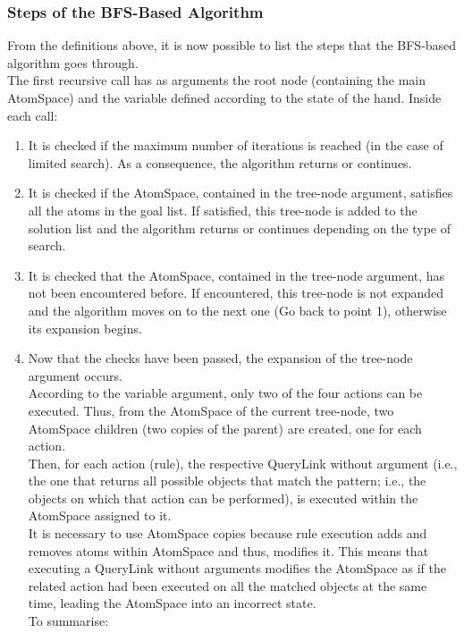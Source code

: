 \subsubsection{Steps of the BFS-Based Algorithm}\label{sec:step_search}

From the definitions above, it is now possible to list the steps that the BFS-based algorithm goes through. \\
The first recursive call has as arguments the root node (containing the main AtomSpace) and the variable defined according to the state of the hand.
Inside each call:

\begin{enumerate}
	\item It is checked if the maximum number of iterations is reached (in the case of limited search). As a consequence, the algorithm returns or continues.
	
	\item It is checked if the AtomSpace, contained in the tree-node argument, satisfies all the atoms in the goal list. If satisfied, this tree-node is added to the solution list and the algorithm returns or continues depending on the type of search.
	
	\item It is checked that the AtomSpace, contained in the tree-node argument, has not been encountered before. If encountered, this tree-node is not expanded and the algorithm moves on to the next one (Go back to point 1), otherwise its expansion begins.
	
	\item Now that the checks have been passed, the expansion of the tree-node argument occurs. \\
According to the variable argument, only two of the four actions can be executed.
Thus, from the AtomSpace of the current tree-node, two AtomSpace children (two copies of the parent) are created, one for each action. \\
Then, for each action (rule), the respective QueryLink without argument (i.e., the one that returns all possible objects that match the pattern; i.e., the objects on which that action can be performed), is executed within the AtomSpace assigned to it. \\
It is necessary to use AtomSpace copies because rule execution adds and removes atoms within AtomSpace and thus, modifies it. This means that executing a QueryLink without arguments modifies the AtomSpace as if the related action had been executed on all the matched objects at the same time, leading the AtomSpace into an incorrect state. \\
To summarise: 


\end{enumerate}
